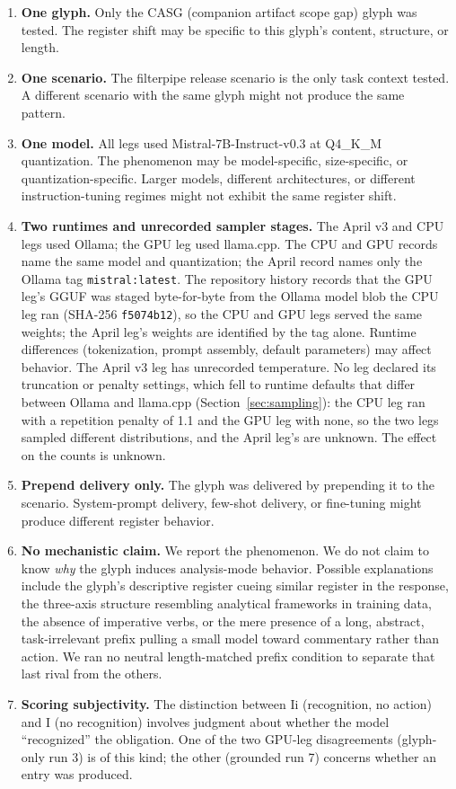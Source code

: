 \documentclass[11pt,a4paper]{article}
\begin{document}
\begin{enumerate}
  \item \textbf{One glyph.} Only the CASG (companion artifact scope gap)
    glyph was tested. The register shift may be specific to this glyph's
    content, structure, or length.
  \item \textbf{One scenario.} The filterpipe release scenario is the only
    task context tested. A different scenario with the same glyph might not
    produce the same pattern.
  \item \textbf{One model.} All legs used Mistral-7B-Instruct-v0.3 at
    Q4\_K\_M quantization. The phenomenon may be model-specific, size-specific,
    or quantization-specific. Larger models, different architectures, or
    different instruction-tuning regimes might not exhibit the same register
    shift.
    \item \textbf{Two runtimes and unrecorded sampler stages.} The April v3
    and CPU legs used Ollama; the GPU leg used llama.cpp. The CPU and GPU records
    name the same model and quantization; the April record names only the
    Ollama tag \texttt{mistral:latest}. The repository history records that the GPU leg's GGUF was staged
    byte-for-byte from the Ollama model blob the CPU leg ran (SHA-256
    \texttt{f5074b12}), so the CPU and GPU legs served the same weights; the
    April leg's weights are identified by the tag alone. Runtime differences (tokenization, prompt assembly,
    default parameters) may affect behavior. The April v3 leg has unrecorded
    temperature. No leg declared its truncation or penalty settings, which
    fell to runtime defaults that differ between Ollama and llama.cpp
    (Section~\ref{sec:sampling}): the CPU leg ran with a repetition penalty
    of 1.1 and the GPU leg with none, so the two legs sampled different
    distributions, and the April leg's are unknown. The effect on the counts
    is unknown.
  \item \textbf{Prepend delivery only.} The glyph was delivered by prepending
    it to the scenario. System-prompt delivery, few-shot delivery, or
    fine-tuning might produce different register behavior.
  \item \textbf{No mechanistic claim.} We report the phenomenon. We do not
    claim to know \emph{why} the glyph induces analysis-mode behavior. Possible
    explanations include the glyph's descriptive register cueing similar
    register in the response, the three-axis structure resembling analytical
    frameworks in training data, the absence of imperative verbs, or the mere
    presence of a long, abstract, task-irrelevant prefix pulling a small model
    toward commentary rather than action. We ran no neutral length-matched
    prefix condition to separate that last rival from the others.
  \item \textbf{Scoring subjectivity.} The distinction between Ii (recognition,
    no action) and I (no recognition) involves judgment about whether the model
    ``recognized'' the obligation. One
    of the two GPU-leg disagreements (glyph-only run 3) is of this kind; the
    other (grounded run 7) concerns whether an entry was produced.
\end{enumerate}
\end{document}
